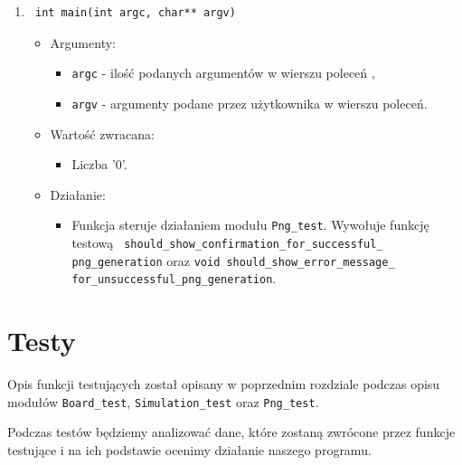 \documentclass[a4paper,11pt, notitlepage ]{article}
\begin{document}
\begin{enumerate}
\item \begin{verbatim} int main(int argc, char** argv) \end{verbatim}
\begin{itemize}
\item Argumenty:
\begin{itemize}
\item \verb+argc+ - ilość podanych argumentów w wierszu poleceń ,
\item \verb+argv+ - argumenty podane przez użytkownika w wierszu poleceń.
\end{itemize}
\item Wartość zwracana:
\begin{itemize}
\item Liczba '0'.
\end{itemize}
\item Działanie:
\begin{itemize}
\item Funkcja steruje działaniem modułu \verb+Png_test+. Wywołuje funkcję testową \verb+ should_show_confirmation_for_successful_+\\\verb+png_generation+ oraz \verb+void should_show_error_message_+\\\verb+for_unsuccessful_png_generation+.
\end{itemize}
\end{itemize}


\end{enumerate}

\section{Testy}
Opis funkcji testujących został opisany w poprzednim rozdziale podczas opisu modułów \verb+Board_test+,
\verb+Simulation_test+ oraz \verb+Png_test+.

Podczas testów będziemy analizować dane, które zostaną zwrócone przez funkcje testujące i na ich podstawie ocenimy działanie naszego programu.
\end{document}
